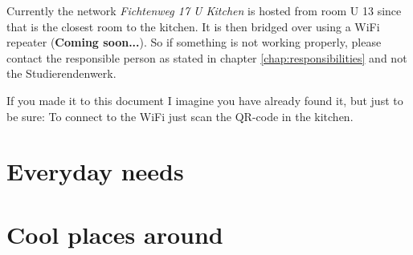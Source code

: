 Currently the network \textit{Fichtenweg 17 U Kitchen} is hosted from room U 13 since that is the closest room to the kitchen. It is then bridged over using a WiFi repeater (\textbf{Coming soon...}). So if something is not working properly, please contact the responsible person as stated in chapter \ref{chap:responsibilities} and not the Studierendenwerk.

If you made it to this document I imagine you have already found it, but just to be sure: To connect to the WiFi just scan the QR-code in the kitchen.

\section{Everyday needs}

\section{Cool places around}